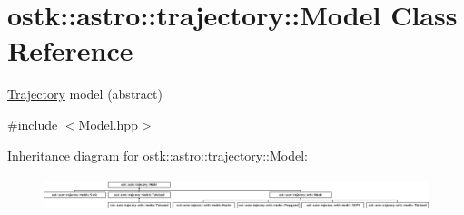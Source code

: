 \hypertarget{classostk_1_1astro_1_1trajectory_1_1_model}{}\section{ostk\+:\+:astro\+:\+:trajectory\+:\+:Model Class Reference}
\label{classostk_1_1astro_1_1trajectory_1_1_model}


\hyperlink{classostk_1_1astro_1_1_trajectory}{Trajectory} model (abstract)  




{\ttfamily \#include $<$Model.\+hpp$>$}

Inheritance diagram for ostk\+:\+:astro\+:\+:trajectory\+:\+:Model\+:\begin{figure}[H]
\begin{center}
\leavevmode
\includegraphics[height=0.989399cm]{classostk_1_1astro_1_1trajectory_1_1_model}
\end{center}
\end{figure}
